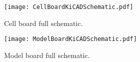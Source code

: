 \section{}\label{sec:KiCADSchematics}
\FloatBarrier
\begin{figure}[ht!]
    \centering
    \texttt{[image: CellBoardKiCADSchematic.pdf]}
    \caption{Cell board full schematic.}
    \label{fig:CellBoardKiCADSchematic}
\end{figure}

\begin{figure}[ht!]
    \centering
    \texttt{[image: ModelBoardKiCADSchematic.pdf]}
    \caption{Model board full schematic.}
    \label{fig:ModelBoardKiCADSchematic}
\end{figure}
\FloatBarrier